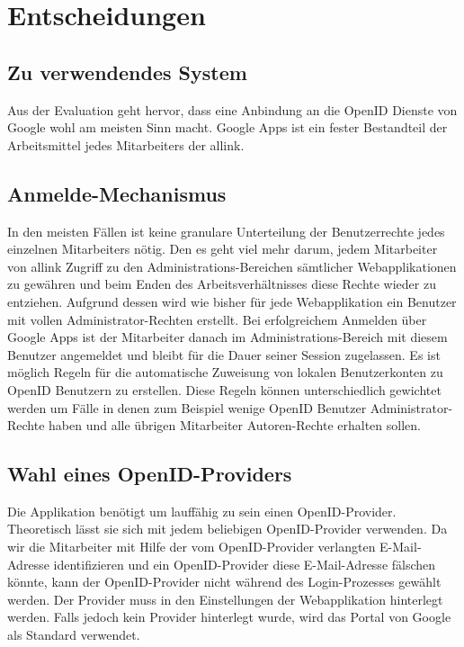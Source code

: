 \section{Entscheidungen}
\label{sec:Entscheidungen}

\subsection{Zu verwendendes System}
\label{sub:Zu verwendendes System}
Aus der Evaluation geht hervor, dass eine Anbindung an die OpenID Dienste von Google wohl am meisten Sinn macht. Google Apps ist ein fester Bestandteil der Arbeitsmittel jedes Mitarbeiters der allink.

\subsection{Anmelde-Mechanismus}
\label{sub:Anmelde-Mechanismus}
In den meisten Fällen ist keine granulare Unterteilung der Benutzerrechte jedes einzelnen Mitarbeiters nötig. Den es geht viel mehr darum, jedem Mitarbeiter von allink Zugriff zu den Administrations-Bereichen sämtlicher Webapplikationen zu gewähren und beim Enden des Arbeitsverhältnisses diese Rechte wieder zu entziehen. Aufgrund dessen wird wie bisher für jede Webapplikation ein Benutzer mit vollen Administrator-Rechten erstellt. Bei erfolgreichem Anmelden über Google Apps ist der Mitarbeiter danach im Administrations-Bereich mit diesem Benutzer angemeldet und bleibt für die Dauer seiner Session zugelassen.
Es ist möglich Regeln für die automatische Zuweisung von lokalen Benutzerkonten zu OpenID Benutzern zu erstellen. Diese Regeln können unterschiedlich gewichtet werden um Fälle in denen zum Beispiel wenige OpenID Benutzer Administrator-Rechte haben und alle übrigen Mitarbeiter Autoren-Rechte erhalten sollen.

\subsection{Wahl eines OpenID-Providers}
\label{sub:Wahl eines OpenID Providers}
Die Applikation benötigt um lauffähig zu sein einen OpenID-Provider. Theoretisch lässt sie sich mit jedem beliebigen OpenID-Provider verwenden. Da wir die Mitarbeiter mit Hilfe der vom OpenID-Provider verlangten E-Mail-Adresse identifizieren und ein OpenID-Provider diese E-Mail-Adresse fälschen könnte, kann der OpenID-Provider nicht während des Login-Prozesses gewählt werden. Der Provider muss in den Einstellungen der Webapplikation hinterlegt werden. Falls jedoch kein Provider hinterlegt wurde, wird das Portal von Google als Standard verwendet.

